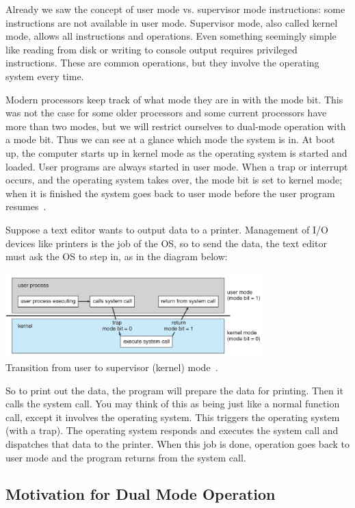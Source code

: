 Already we saw the concept of user mode vs. supervisor mode instructions: some instructions are not available in user mode. Supervisor mode, also called kernel mode, allows all instructions and operations. Even something seemingly simple like reading from disk or writing to console output requires privileged instructions. These are common operations, but they involve the operating system every time.

Modern processors keep track of what mode they are in with the mode bit. This was not the case for some older processors and some current processors have more than two modes, but we will restrict ourselves to dual-mode operation with a mode bit. Thus we can see at a glance which mode the system is in. At boot up, the computer starts up in kernel mode as the operating system is started and loaded. User programs are always started in user mode. When a trap or interrupt occurs, and the operating system takes over, the mode bit is set to kernel mode; when it is finished the system goes back to user mode before the user program resumes~\cite{osc}.

Suppose a text editor wants to output data to a printer. Management of I/O devices like printers is the job of the OS, so to send the data, the text editor must ask the OS to step in, as in the diagram below:

\begin{center}
	\includegraphics[width=0.75\textwidth]{images/trap.png}\\
	Transition from user to supervisor (kernel) mode~\cite{osc}.
\end{center}


So to print out the data, the program will prepare the data for printing. Then it calls the system call. You may think of this as being just like a normal function call, except it involves the operating system. This triggers the operating system (with a trap). The operating system responds and executes the system call and dispatches that data to the printer. When this job is done, operation goes back to user mode and the program returns from the system call.

\subsection*{Motivation for Dual Mode Operation}

